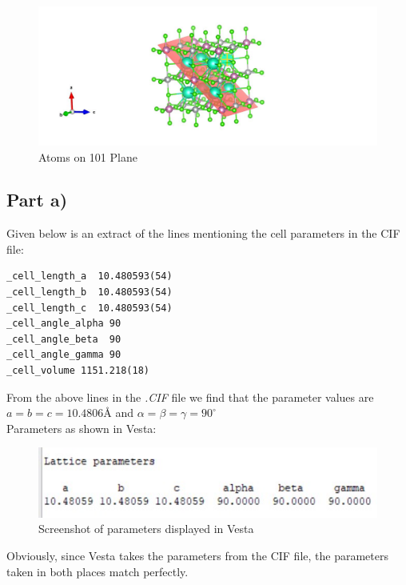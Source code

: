 \documentclass{homework}
\begin{document}
\FloatBarrier
\begin{figure}[!h]
\centering
\includegraphics[width=1\textwidth]{q1part_i_101.jpg}
\caption{Atoms on 101 Plane}
\label{101}
\end{figure}
\FloatBarrier

\exercise
\subsection*{Part a)}
Given below is an extract of the lines mentioning the cell parameters in the CIF file:
\begin{lstlisting}
_cell_length_a  10.480593(54)
_cell_length_b  10.480593(54)
_cell_length_c  10.480593(54)
_cell_angle_alpha 90
_cell_angle_beta  90
_cell_angle_gamma 90
_cell_volume 1151.218(18)
\end{lstlisting}
From the above lines in the \textit{.CIF} file we find that the parameter values are $a = b = c = 10.4806$\AA{}  and $\alpha = \beta = \gamma = 90^{\circ}$
\\
Parameters as shown in Vesta:
\begin{figure}[!h]
\centering
\includegraphics[width=1\textwidth]{vesta_params.jpg}
\caption{Screenshot of parameters displayed in Vesta}
\end{figure}
\FloatBarrier
Obviously, since Vesta takes the parameters from the CIF file, the parameters taken in both places match perfectly.
\end{document}
